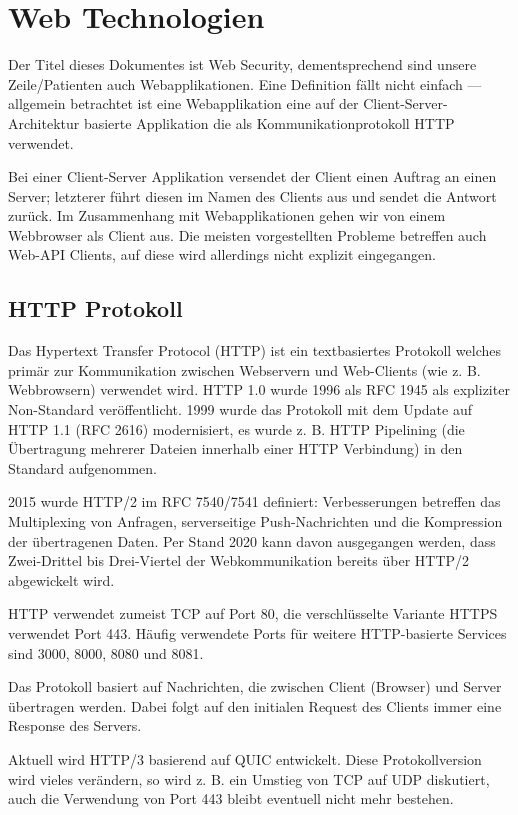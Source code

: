 \chapter{Web Technologien}

Der Titel dieses Dokumentes ist Web Security, dementsprechend sind unsere Zeile/Patienten auch Webapplikationen. Eine Definition fällt nicht einfach --- allgemein betrachtet ist eine Webapplikation eine auf der Client-Server-Architektur basierte Applikation die als Kommunikationprotokoll HTTP verwendet.

Bei einer Client-Server Applikation versendet der Client einen Auftrag an einen Server; letzterer führt diesen im Namen des Clients aus und sendet die Antwort zurück. Im Zusammenhang mit Webapplikationen gehen wir von einem Webbrowser als Client aus. Die meisten vorgestellten Probleme betreffen auch Web-API Clients, auf diese wird allerdings nicht explizit eingegangen.

\section{HTTP Protokoll}

Das Hypertext Transfer Protocol (HTTP) ist ein textbasiertes Protokoll welches primär zur Kommunikation zwischen Webservern und Web-Clients (wie z. B. Webbrowsern) verwendet wird. HTTP 1.0 wurde 1996 als RFC 1945 als expliziter Non-Standard veröffentlicht. 1999 wurde das Protokoll mit dem Update auf HTTP 1.1 (RFC 2616) modernisiert, es wurde z. B. HTTP Pipelining (die Übertragung mehrerer Dateien innerhalb einer HTTP Verbindung) in den Standard aufgenommen.

2015 wurde HTTP/2 im RFC 7540/7541 definiert: Verbesserungen betreffen das Multiplexing von Anfragen, serverseitige Push-Nachrichten und die Kompression der übertragenen Daten. Per Stand 2020 kann davon ausgegangen werden, dass Zwei-Drittel bis Drei-Viertel der Webkommunikation bereits über HTTP/2 abgewickelt wird.

HTTP verwendet zumeist TCP auf Port 80, die verschlüsselte Variante HTTPS verwendet Port 443. Häufig verwendete Ports für weitere HTTP-basierte Services sind 3000, 8000, 8080 und 8081.

Das Protokoll basiert auf Nachrichten, die zwischen Client (Browser) und Server übertragen werden. Dabei folgt auf den initialen Request des Clients immer eine Response des Servers.

Aktuell wird HTTP/3 basierend auf QUIC entwickelt. Diese Protokollversion wird vieles verändern, so wird z. B. ein Umstieg von TCP auf UDP diskutiert, auch die Verwendung von Port 443 bleibt eventuell nicht mehr bestehen.

